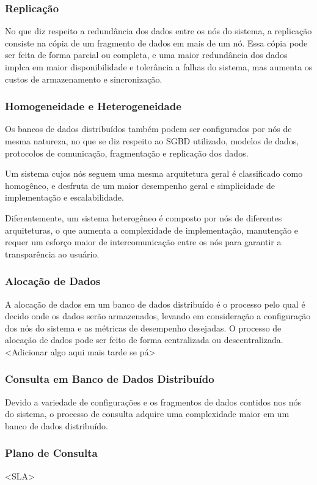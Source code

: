 \subsubsection{Replicação}
No que diz respeito a redundância dos dados entre os nós do sistema,
a replicação consiste na cópia de um fragmento de dados em mais de um nó. 
Essa cópia pode ser feita de forma parcial ou completa, e uma maior redundância dos dados 
implca em maior disponibilidade e tolerância a falhas do sistema, mas aumenta os custos de armazenamento e sincronização.

\subsubsection{Homogeneidade e Heterogeneidade}
Os bancos de dados distribuídos também podem ser configurados por nós de mesma natureza,
no que se diz respeito ao SGBD utilizado, modelos de dados, protocolos de comunicação,
fragmentação e replicação dos dados. 

Um sistema cujos nós seguem uma mesma arquitetura geral é classificado como homogêneo, 
e desfruta de um maior desempenho geral e simplicidade de implementação e escalabilidade.

Diferentemente, um sistema heterogêneo é composto por nós de diferentes arquiteturas,
o que aumenta a complexidade de implementação, manutenção e requer um esforço maior
de intercomunicação entre os nós para garantir a transparência ao usuário. 

\subsubsection{Alocação de Dados}
A alocação de dados em um banco de dados distribuído é o processo pelo qual é decido onde os dados serão armazenados,
levando em consideração a configuração dos nós do sistema e as métricas de desempenho desejadas.
O processo de alocação de dados pode ser feito de forma centralizada ou descentralizada.
<Adicionar algo aqui mais tarde se pá>

\subsubsection{Consulta em Banco de Dados Distribuído}
Devido a variedade de configurações e os fragmentos de dados contidos nos nós do sistema,
o processo de consulta adquire uma complexidade maior em um banco de dados distribuído.

\subsubsection{Plano de Consulta}
<SLA>

